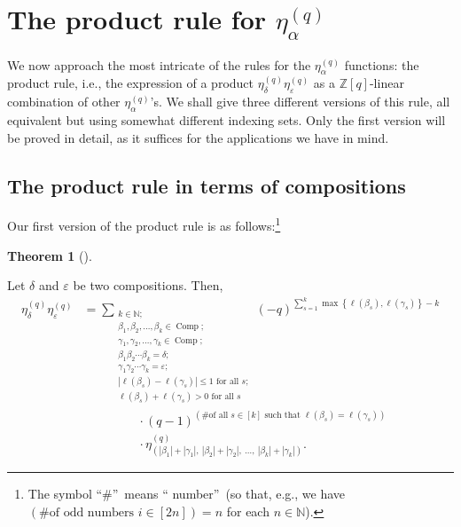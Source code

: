 \documentclass[numbers=enddot,12pt,final,onecolumn,notitlepage]{scrartcl}%
\theoremstyle{definition}
\newtheorem{theo}{Theorem}[section]
\newenvironment{theorem}[1][]
{\begin{theo}[#1]\begin{leftbar}}
{\end{leftbar}\end{theo}}
\let\sumnonlimits\sum
\renewcommand{\sum}{\sumnonlimits\limits}
\begin{document}
\section{\label{sec.prod}The product rule for $\eta_{\alpha}^{\left(
q\right)  }$}

We now approach the most intricate of the rules for the $\eta_{\alpha
}^{\left(  q\right)  }$ functions: the product rule, i.e., the expression of a
product $\eta_{\delta}^{\left(  q\right)  }\eta_{\varepsilon}^{\left(
q\right)  }$ as a $\mathbb{Z}\left[  q\right]  $-linear combination of other
$\eta_{\alpha}^{\left(  q\right)  }$'s. We shall give three different versions
of this rule, all equivalent but using somewhat different indexing sets. Only
the first version will be proved in detail, as it suffices for the
applications we have in mind.

\subsection{The product rule in terms of compositions}

Our first version of the product rule is as follows:\footnote{The symbol
\textquotedblleft\#\textquotedblright\ means \textquotedblleft
number\textquotedblright\ (so that, e.g., we have $\left(  \text{\# of odd
numbers }i\in\left[  2n\right]  \right)  =n$ for each $n\in\mathbb{N}$).}

\begin{theorem}
\label{thm.product.1}Let $\delta$ and $\varepsilon$ be two compositions. Then,%
\begin{align*}
\eta_{\delta}^{\left(  q\right)  }\eta_{\varepsilon}^{\left(  q\right)  }  &
=\sum_{\substack{k\in\mathbb{N};\\\beta_{1},\beta_{2},\ldots,\beta_{k}%
\in\operatorname*{Comp};\\\gamma_{1},\gamma_{2},\ldots,\gamma_{k}%
\in\operatorname*{Comp};\\\beta_{1}\beta_{2}\cdots\beta_{k}=\delta
;\\\gamma_{1}\gamma_{2}\cdots\gamma_{k}=\varepsilon;\\\left\vert \ell\left(
\beta_{s}\right)  -\ell\left(  \gamma_{s}\right)  \right\vert \leq1\text{ for
all }s;\\\ell\left(  \beta_{s}\right)  +\ell\left(  \gamma_{s}\right)
>0\text{ for all }s}}\left(  -q\right)  ^{\sum_{s=1}^{k}\max\left\{
\ell\left(  \beta_{s}\right)  ,\ell\left(  \gamma_{s}\right)  \right\}  -k}\\
&  \ \ \ \ \ \ \ \ \ \ \ \ \ \ \ \ \ \ \ \ \cdot\left(  q-1\right)  ^{\left(
\text{\# of all }s\in\left[  k\right]  \text{ such that }\ell\left(  \beta
_{s}\right)  =\ell\left(  \gamma_{s}\right)  \right)  }\\
&  \ \ \ \ \ \ \ \ \ \ \ \ \ \ \ \ \ \ \ \ \cdot\eta_{\left(  \left\vert
\beta_{1}\right\vert +\left\vert \gamma_{1}\right\vert ,\ \left\vert \beta
_{2}\right\vert +\left\vert \gamma_{2}\right\vert ,\ \ldots,\ \left\vert
\beta_{k}\right\vert +\left\vert \gamma_{k}\right\vert \right)  }^{\left(
q\right)  }.
\end{align*}

\end{theorem}
\end{document}
